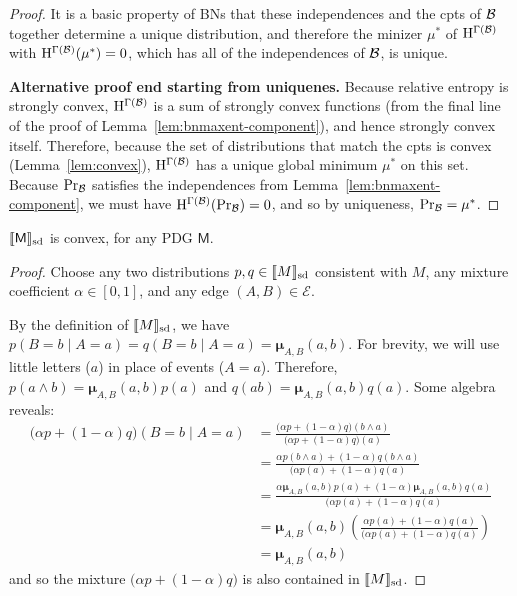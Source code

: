 \documentclass{article}
\newcommand{\bmu}{\boldsymbol{\mu}}
\newcommand{\Ed}{\mathcal E}
\newcommand{\sfM}{\mathsf M}
\def\Pa{\mathbf{Pa}}
\newcommand\SD{_{\text{sd}}}
\begin{document}
\begin{proof}
		
	
	
	
	 It is a basic property of BNs that these independences and the cpts of $\cal B$ together determine a unique distribution, and therefore the minizer $\mu^*$ of $\mathrm{H}^{\Gamma(\mathcal B)}$ with $\mathrm{H}^{\Gamma(\mathcal B)}(\mu^*) = 0$, which has all of the independences of $\cal B$, is unique.
	
	
	\textbf{Alternative proof end starting from uniquenes.}	
	Because relative entropy is strongly convex, $\mathrm{H}^{\Gamma(\mathcal B)}$ is a sum of strongly convex functions (from the final line of the proof of Lemma~\ref{lem:bnmaxent-component}), and hence strongly convex itself. Therefore, because the set of distributions that match the cpts is convex (Lemma~\ref{lem:convex}), $\mathrm{H}^{\Gamma(\mathcal B)}$ has a unique global minimum $\mu^*$ on this set. Because $\Pr_{\cal B}$ satisfies the independences from Lemma~\ref{lem:bnmaxent-component}, we must have $\mathrm{H}^{\Gamma(\mathcal B)}(\Pr_{\cal B}) = 0$, and so by uniqueness, $\Pr_{\cal B} = \mu^*$.
\end{proof}

\clearpage

\begin{lemma}
	\label{lem:convex}
	$\bbr{\sfM}\SD$ is convex, for any PDG  $\sfM$.
\end{lemma}%
\begin{proof}
	Choose any two distributions $p, q \in \bbr{M}\SD$ consistent with $M$, any mixture coefficient $\alpha \in [0,1]$, and any edge $(A,B) \in \Ed$.
	
	By the definition of $\bbr{M}\SD$, we have $p(B = b \mid A = a) = q(B = b \mid A = a) = \bmu_{A,B}(a,b)$.  
	For brevity, we will use little letters ($a$) in place of events ($A = a$).
	Therefore, $p(a\land b) = \bmu_{A,B}(a,b) p(a)$ and $q(ab) = \bmu_{A,B}(a,b) q(a)$. Some algebra reveals:
	\begin{align*}
		\Big( \alpha p + (1-\alpha) q \Big) (B = b \mid A = a) &= 
		\frac{\Big( \alpha p + (1-\alpha) q \Big) (b \land a)}{\Big( \alpha p + (1-\alpha) q \Big) (a)} \\
		&= \frac{ \alpha p(b \land a) + (1-\alpha) q(b \land a) }{\Big( \alpha p(a) + (1-\alpha) q (a)} \\
		&= \frac{ \alpha \bmu_{A,B}(a,b) p(a) + (1-\alpha) \bmu_{A,B}(a,b) q(a) }{\Big( \alpha p(a) + (1-\alpha) q (a)} \\
		&=\bmu_{A,B}(a,b) \left(\frac{ \alpha  p(a) + (1-\alpha) q(a) }{\Big( \alpha p(a) + (1-\alpha) q (a)}\right)\\
		&= \bmu_{A,B}(a,b)
	\end{align*}
	and so the mixture $\Big(\alpha p + (1-\alpha) q \Big)$ is also contained in $\bbr{M}\SD$.
\end{proof}
\end{document}
